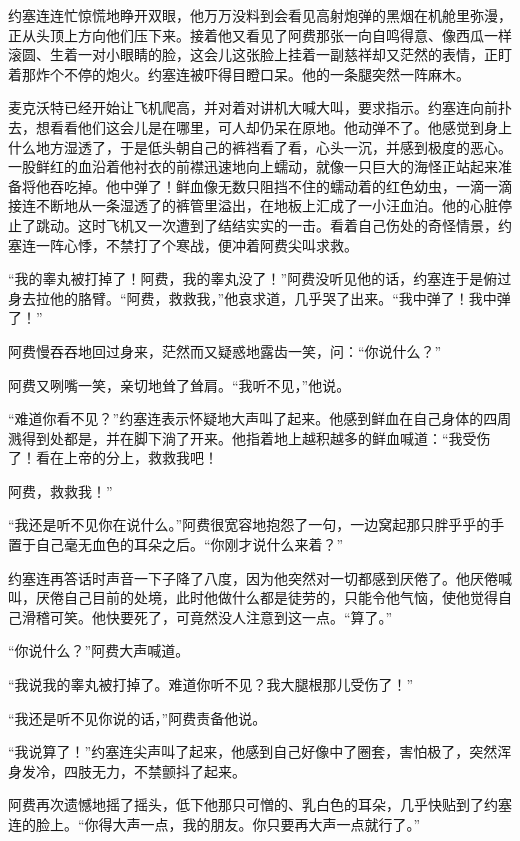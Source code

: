     约塞连连忙惊慌地睁开双眼，他万万没料到会看见高射炮弹的黑烟在机舱里弥漫，正从头顶上方向他们压下来。接着他又看见了阿费那张一向自鸣得意、像西瓜一样滚圆、生着一对小眼睛的脸，这会儿这张脸上挂着一副慈祥却又茫然的表情，正盯着那炸个不停的炮火。约塞连被吓得目瞪口呆。他的一条腿突然一阵麻木。

    麦克沃特已经开始让飞机爬高，并对着对讲机大喊大叫，要求指示。约塞连向前扑去，想看看他们这会儿是在哪里，可人却仍呆在原地。他动弹不了。他感觉到身上什么地方湿透了，于是低头朝自己的裤裆看了看，心头一沉，并感到极度的恶心。一股鲜红的血沿着他衬衣的前襟迅速地向上蠕动，就像一只巨大的海怪正站起来准备将他吞吃掉。他中弹了！鲜血像无数只阻挡不住的蠕动着的红色幼虫，一滴一滴接连不断地从一条湿透了的裤管里溢出，在地板上汇成了一小汪血泊。他的心脏停止了跳动。这时飞机又一次遭到了结结实实的一击。看着自己伤处的奇怪情景，约塞连一阵心悸，不禁打了个寒战，便冲着阿费尖叫求救。

 


    “我的睾丸被打掉了！阿费，我的睾丸没了！”阿费没听见他的话，约塞连于是俯过身去拉他的胳臂。“阿费，救救我，”他哀求道，几乎哭了出来。“我中弹了！我中弹了！”

    阿费慢吞吞地回过身来，茫然而又疑惑地露齿一笑，问：“你说什么？”

    阿费又咧嘴一笑，亲切地耸了耸肩。“我听不见，”他说。

    “难道你看不见？”约塞连表示怀疑地大声叫了起来。他感到鲜血在自己身体的四周溅得到处都是，并在脚下淌了开来。他指着地上越积越多的鲜血喊道：“我受伤了！看在上帝的分上，救救我吧！

    阿费，救救我！”

    “我还是听不见你在说什么。”阿费很宽容地抱怨了一句，一边窝起那只胖乎乎的手置于自己毫无血色的耳朵之后。“你刚才说什么来着？”

    约塞连再答话时声音一下子降了八度，因为他突然对一切都感到厌倦了。他厌倦喊叫，厌倦自己目前的处境，此时他做什么都是徒劳的，只能令他气恼，使他觉得自己滑稽可笑。他快要死了，可竟然没人注意到这一点。“算了。”

    “你说什么？”阿费大声喊道。

    “我说我的睾丸被打掉了。难道你听不见？我大腿根那儿受伤了！”

    “我还是听不见你说的话，”阿费责备他说。

    “我说算了！”约塞连尖声叫了起来，他感到自己好像中了圈套，害怕极了，突然浑身发冷，四肢无力，不禁颤抖了起来。

    阿费再次遗憾地摇了摇头，低下他那只可憎的、乳白色的耳朵，几乎快贴到了约塞连的脸上。“你得大声一点，我的朋友。你只要再大声一点就行了。”
 


